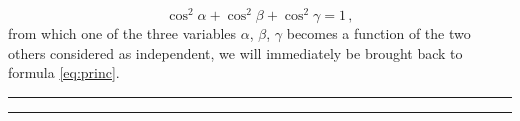 \documentclass[leqno,openright,smallroyalvopaper,8pt,twoside,showtrims]{memoir}
\begin{document}
\begin{equation}
\cos^2\alpha+\cos^2\beta+\cos^2\gamma = 1\,,
\end{equation}
from which one of the three variables $\alpha$, $\beta$, $\gamma$ becomes a function of the two others considered as independent, we will immediately be brought back to formula \eqref{eq:princ}.


\vspace*{.5cm}
\noindent
\rule{\textwidth}{0.5pt}\vspace*{-\baselineskip}\vspace*{2pt} 
\rule{\textwidth}{0.5pt} 
\end{document}
